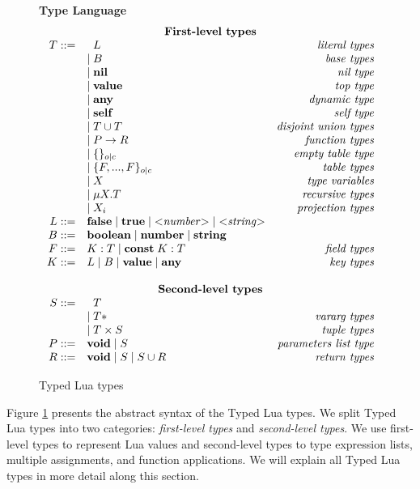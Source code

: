 \begin{figure}[!ht]
\textbf{Type Language}\\
\dstart
$$
\begin{array}{rlr}
\multicolumn{3}{c}{\textbf{First-level types}}\\
T ::= & \;\; L & \textit{literal types}\\
& | \; B & \textit{base types}\\
& | \; \Nil & \textit{nil type}\\
& | \; \Value & \textit{top type}\\
& | \; \Any & \textit{dynamic type}\\
& | \; \Self & \textit{self type}\\
& | \; T \cup T & \textit{disjoint union types}\\
& | \; P \rightarrow R & \textit{function types}\\
& | \; \{ \}_{o|c} & \textit{empty table type}\\
& | \; \{F, ..., F\}_{o|c} & \textit{table types}\\
& | \; X & \textit{type variables}\\
& | \; \mu X.T & \textit{recursive types}\\
& | \; X_{i} & \textit{projection types}\\
L ::= & \False \; | \; \True \; | \; {<}{\it number}{>} \; | \; {<}{\it string}{>} & \\
B ::= & \Boolean \; | \; \Number \; | \; \String & \\
F ::= & K:T \; | \; \Const \; K:T & \textit{field types}\\ 
K ::= & L \; | \; B \; | \; \Value \; | \; \Any & \textit{key types}\\
\multicolumn{3}{c}{}\\
\multicolumn{3}{c}{\textbf{Second-level types}}\\
S ::= & \;\; T &\\
& | \; T* & \textit{vararg types}\\
& | \; T \times S & \textit{tuple types}\\
P ::= & \Void \; | \; S & \textit{parameters list type}\\
R ::= & \Void \; | \; S \; | \; S \cup R & \textit{return types}\\
\end{array}
$$
\dend
\caption{Typed Lua types}
\label{fig:typelang}
\end{figure}

Figure \ref{fig:typelang} presents the abstract syntax of the
Typed Lua types.
We split Typed Lua types into two categories:
\emph{first-level types} and \emph{second-level types}.
We use first-level types to represent Lua values and
second-level types to type expression lists, multiple assignments,
and function applications.
We will explain all Typed Lua types in more detail along this section.

